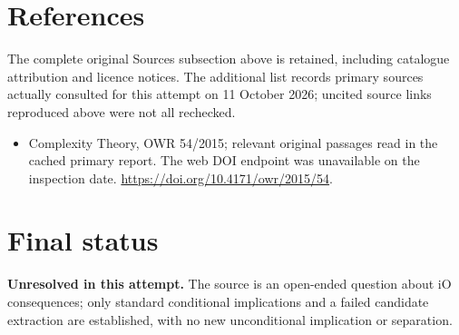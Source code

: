 \documentclass[11pt]{article}
\begin{document}
\section{References}
The complete original Sources subsection above is retained, including catalogue attribution and licence notices. The additional list records primary sources actually consulted for this attempt on 11 October 2026; uncited source links reproduced above were not all rechecked.
\begin{itemize}
\item Complexity Theory, OWR 54/2015; relevant original passages read in the cached primary report. The web DOI endpoint was unavailable on the inspection date. \url{https://doi.org/10.4171/owr/2015/54}.
\end{itemize}
\section{Final status}
\textbf{Unresolved in this attempt.} The source is an open-ended question about iO consequences; only standard conditional implications and a failed candidate extraction are established, with no new unconditional implication or separation.
\end{document}
